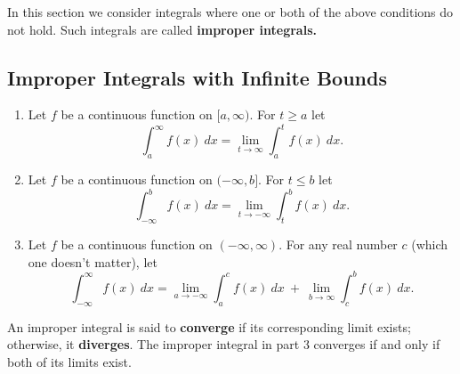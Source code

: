 In this section we consider integrals where one or both of the above conditions do not hold. Such integrals are called \textbf{improper integrals.}

\clearpage

\subsection{Improper Integrals with Infinite Bounds}

\begin{definition}\label{def:imp_int1}
\begin{enumerate}
\item		Let $f$ be a continuous function on $[a,\infty)$. For $t \geq a$ let \[\int_a^\infty f(x)\ dx = \lim_{t\to\infty}\int_a^t f(x)\ dx.\]

\item		Let $f$ be a continuous function on $(-\infty,b]$. For $t \leq b$ let
\[\int_{-\infty}^b f(x)\ dx = \lim_{t\to-\infty}\int_t^b f(x)\ dx.\]

\item		Let $f$ be a continuous function on $(-\infty,\infty)$. For any real number $c$ (which one doesn't matter), let
\[
\int_{-\infty}^\infty f(x)\ dx
= \lim_{a\to-\infty}\int_a^c f(x)\ dx\ +\ \lim_{b\to\infty}\int_c^b f(x)\ dx.
\]
\end{enumerate}
\end{definition}

An improper integral is said to \textbf{converge} if its corresponding limit exists; otherwise, it \textbf{diverges}. The improper integral in part 3 converges if and only if both of its limits exist.


